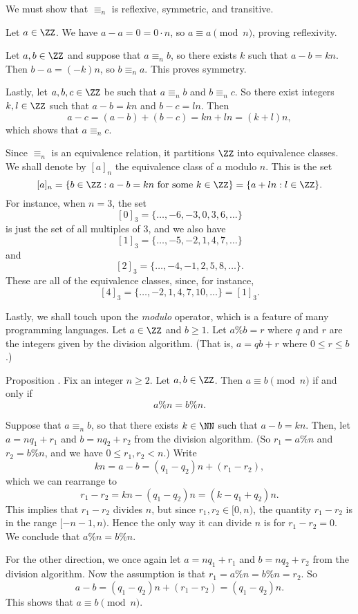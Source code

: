 \proof We must show that $\equiv_n$ is reflexive, symmetric, and transitive.

Let $a\in \ZZ$. We have $a-a = 0 = 0\cdot n$, so $a\equiv a\pmod n$, proving reflexivity.

Let $a,b\in \ZZ$ and suppose that $a\equiv_n b$, so there exists $k$ such that $a-b=kn$.
Then $b-a = (-k)n$, so $b\equiv_n a$. This proves symmetry.

Lastly, let $a,b,c\in \ZZ$ be such that $a\equiv_n b$ and $b\equiv_n c$. So there
exist integers $k,l\in \ZZ$ such that $a-b = kn$ and $b-c = ln$. Then
$$a - c = (a-b) + (b-c) = kn +ln = (k+l)n,$$
which shows that $a\equiv_n c$.\slug

Since $\equiv_n$ is an equivalence relation, it partitions $\ZZ$ into equivalence classes.
We shall denote by $[a]_n$ the equivalence class of $a$ modulo $n$. This is the set
$$[a]_n = \{b\in \ZZ : a-b = kn\ \hbox{for some}\ k\in \ZZ\}
= \{a + ln : l\in \ZZ\}.$$
For instance, when $n = 3$, the set
$$[0]_3 = \{\ldots, -6, -3, 0, 3, 6, \ldots\}$$
is just the set of all multiples of $3$, and we also have
$$[1]_3 = \{\ldots, -5, -2, 1, 4, 7,\ldots\}$$
and
$$[2]_3 = \{\ldots, -4, -1, 2, 5, 8,\ldots\}.$$
These are all of the equivalence classes, since, for instance,
$$[4]_3 = \{\ldots, -2, 1, 4, 7, 10,\ldots\} = [1]_3.$$

Lastly, we shall touch upon the {\it modulo} operator, which is a feature of many programming
languages. Let $a\in \ZZ$ and $b\ge 1$. Let $a \percent b = r$ where $q$ and $r$ are the integers
given by the division algorithm. (That is, $a = qb+r$ where $0\le r\le b$.)

\proclaim Proposition \advthm. Fix an integer $n\ge 2$.
Let $a,b\in \ZZ$. Then $a\equiv b\pmod n$ if and only
if
$$a\percent n = b\percent n.$$

\proof
Suppose that $a\equiv_n b$, so that there exists $k\in \NN$ such that $a-b = kn$.
Then, let $a = nq_1 + r_1$ and $b = nq_2 + r_2$ from the division algorithm.
(So $r_1 = a\percent n$ and $r_2 = b\percent n$, and we have $0\le r_1,r_2 < n$.)
Write
$$kn = a - b = (q_1-q_2) n + (r_1 - r_2),$$
which we can rearrange to
$$r_1 - r_2 = kn - (q_1 - q_2)n = (k-q_1 + q_2)n.$$
This implies that $r_1 - r_2$ divides $n$, but
since $r_1, r_2\in [0,n)$, the quantity $r_1 - r_2$ is in the range $[-n-1, n)$. Hence
the only way it can divide $n$ is for $r_1 - r_2 = 0$. We conclude that $a\percent n = b\percent n$.

For the other direction, we once again
let $a = nq_1 + r_1$ and $b = nq_2 + r_2$ from the division algorithm.
Now the assumption is that $r_1 = a\percent n = b\percent n = r_2$. So
$$a - b = (q_1-q_2) n + (r_1 - r_2) = (q_1-q_2)n.$$
This shows that $a\equiv b\pmod n$.\slug

